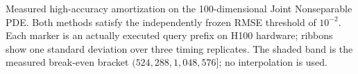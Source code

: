 Measured high-accuracy amortization on the 100-dimensional Joint Nonseparable PDE. Both methods satisfy the independently frozen RMSE threshold of $10^{-2}$. Each marker is an actually executed query prefix on H100 hardware; ribbons show one standard deviation over three timing replicates. The shaded band is the measured break-even bracket $(524,288, 1,048,576]$; no interpolation is used.
